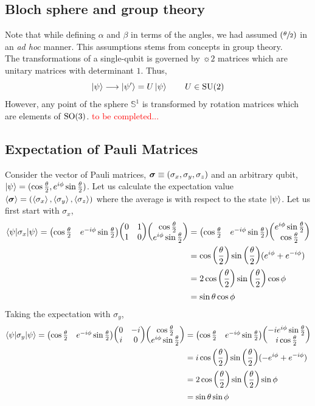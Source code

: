 \subsection{Bloch sphere and group theory}
Note that while defining $\alpha$ and $\beta$ in terms of the angles, we had assumed $\qty(\sfrac{\theta}{2})$ in an \textit{ad hoc} manner. This assumptions stems from concepts in group theory.\\[0.2cm]
The transformations of a single-qubit is governed by $\sun{2}$ matrices which are unitary matrices with determinant $1$. Thus, 
$$\ket{\psi} \longrightarrow \ket{\psi'} = U\ket{\psi} \qquad U\in \mathrm{SU}(2)$$
However, any point of the sphere $\mathbb{S}^1$ is transformed by rotation matrices which are elements of $\mathrm{SO}(3)$. \textcolor{red}{to be completed...}
\subsection{Expectation of Pauli Matrices}
Consider the vector of Pauli matrices, $\boldsymbol{\sigma} \equiv (\sigma_x, \sigma_y,\sigma_z)$ and an arbitrary qubit, $\ket{\psi} = (\cos\frac{\theta}{2}, e^{i\phi}\sin\frac{\theta}{2})$. Let us calculate the expectation value $\left\langle \boldsymbol{\sigma} \right\rangle = (\left\langle \sigma_x \right\rangle,\left\langle \sigma_y \right\rangle,\left\langle \sigma_z \right\rangle)$ where the average is with respect to the state $\ket{\psi}$. Let us first start with $\sigma_x$,
\begin{align*}
    \braket{\psi|\sigma_x|\psi} = \mqty(\cos\frac{\theta}{2}& e^{-i\phi}\sin\frac{\theta}{2}) \mqty(0 & 1 \\ 1 & 0)\mqty(\cos\frac{\theta}{2}\\ e^{i\phi}\sin\frac{\theta}{2}) &= \mqty(\cos\frac{\theta}{2}& e^{-i\phi}\sin\frac{\theta}{2}) \mqty(e^{i\phi}\sin\frac{\theta}{2}\\\cos\frac{\theta}{2})\\ &=\cos\qty(\frac{\theta}{2}) \sin\qty(\frac{\theta}{2})(e^{i\phi}+e^{-i\phi})\\ &= 2 \cos\qty(\frac{\theta}{2}) \sin\qty(\frac{\theta}{2}) \cos\phi \\ &= \sin\theta\cos\phi
\end{align*}
Taking the expectation with $\sigma_y$,
\begin{align*}
    \braket{\psi|\sigma_y|\psi} = \mqty(\cos\frac{\theta}{2}& e^{-i\phi}\sin\frac{\theta}{2}) \mqty(0 & -i \\ i & 0)\mqty(\cos\frac{\theta}{2}\\ e^{i\phi}\sin\frac{\theta}{2}) &= \mqty(\cos\frac{\theta}{2}& e^{-i\phi}\sin\frac{\theta}{2}) \mqty(-ie^{i\phi}\sin\frac{\theta}{2}\\ i\cos\frac{\theta}{2})\\ &=i\cos\qty(\frac{\theta}{2}) \sin\qty(\frac{\theta}{2})(-e^{i\phi}+e^{-i\phi})\\ &= 2 \cos\qty(\frac{\theta}{2}) \sin\qty(\frac{\theta}{2}) \sin\phi \\ &= \sin\theta\sin\phi
\end{align*}

